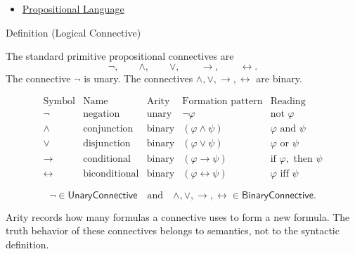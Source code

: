 \begin{dependencies}
\begin{itemize}
  \item \hyperref[def:propositional-language]{Propositional Language}
\end{itemize}
\end{dependencies}
\begin{definitionbox}{Definition (Logical Connective)}
\begin{definition}
\label{def:logical-connective}
The standard primitive propositional connectives are
\[
\neg,\qquad \land,\qquad \lor,\qquad \to,\qquad \leftrightarrow.
\]
The connective \(\neg\) is unary. The connectives \(\land,\lor,\to,\leftrightarrow\) are binary.

\[
\begin{array}{c|c|c|c|c}
\text{Symbol} & \text{Name} & \text{Arity} & \text{Formation pattern} & \text{Reading}\\
\hline
\neg & \text{negation} & \text{unary} & \neg\varphi & \text{not }\varphi\\
\land & \text{conjunction} & \text{binary} & (\varphi\land\psi) & \varphi\text{ and }\psi\\
\lor & \text{disjunction} & \text{binary} & (\varphi\lor\psi) & \varphi\text{ or }\psi\\
\to & \text{conditional} & \text{binary} & (\varphi\to\psi) & \text{if }\varphi,\text{ then }\psi\\
\leftrightarrow & \text{biconditional} & \text{binary} & (\varphi\leftrightarrow\psi) & \varphi\text{ iff }\psi
\end{array}
\]
\end{definition}
\end{definitionbox}

\begin{remark*}
\[
\neg\in\mathsf{UnaryConnective}
\quad\text{and}\quad
\land,\lor,\to,\leftrightarrow\in\mathsf{BinaryConnective}.
\]
\end{remark*}

\begin{remark*}[Interpretation]
Arity records how many formulas a connective uses to form a new formula. The truth behavior of these connectives belongs to semantics, not to the syntactic definition.
\end{remark*}

